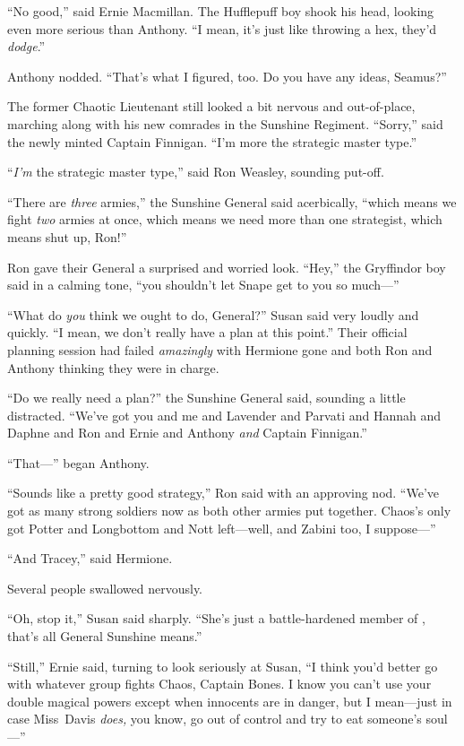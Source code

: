 “No good,” said Ernie Macmillan. The Hufflepuff boy shook his head, looking even more serious than Anthony. “I mean, it’s just like throwing a hex, they’d \emph{dodge}.”

Anthony nodded. “That’s what I figured, too. Do you have any ideas, Seamus?”

The former Chaotic Lieutenant still looked a bit nervous and out-of-place, marching along with his new comrades in the Sunshine Regiment. “Sorry,” said the newly minted Captain Finnigan. “I’m more the strategic master type.”

“\emph{I’m} the strategic master type,” said Ron Weasley, sounding put-off.

“There are \emph{three} armies,” the Sunshine General said acerbically, “which means we fight \emph{two} armies at once, which means we need more than one strategist, which means shut up, Ron!”

Ron gave their General a surprised and worried look. “Hey,” the Gryffindor boy said in a calming tone, “you shouldn’t let Snape get to you so much—”

“What do \emph{you} think we ought to do, General?” Susan said very loudly and quickly. “I mean, we don’t really have a plan at this point.” Their official planning session had failed \emph{amazingly} with Hermione gone and both Ron and Anthony thinking they were in charge.

“Do we really need a plan?” the Sunshine General said, sounding a little distracted. “We’ve got you and me and Lavender and Parvati and Hannah and Daphne and Ron and Ernie and Anthony \emph{and} Captain Finnigan.”

“That—” began Anthony.

“Sounds like a pretty good strategy,” Ron said with an approving nod. “We’ve got as many strong soldiers now as both other armies put together. Chaos’s only got Potter and Longbottom and Nott left—well, and Zabini too, I suppose—”

“And Tracey,” said Hermione.

Several people swallowed nervously.

“Oh, stop it,” Susan said sharply. “She’s just a battle-hardened member of \SPHEW, that’s all General Sunshine means.”

“Still,” Ernie said, turning to look seriously at Susan, “I think you’d better go with whatever group fights Chaos, Captain Bones. I know you can’t use your double magical powers except when innocents are in danger, but I mean—just in case Miss~Davis \emph{does,} you know, go out of control and try to eat someone’s soul—”

